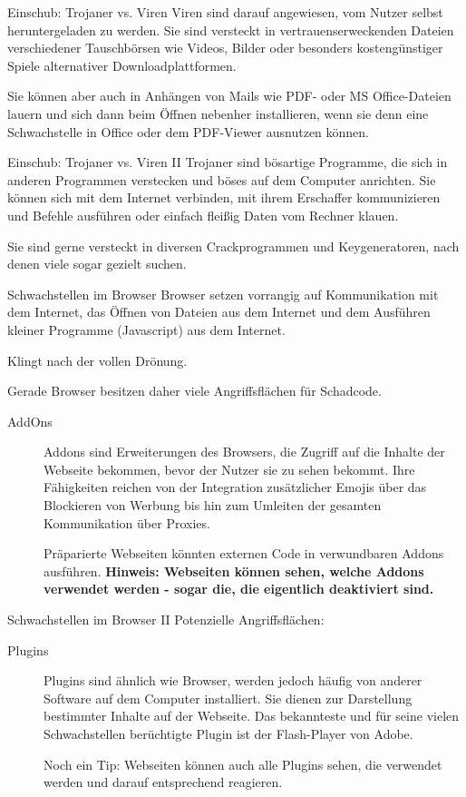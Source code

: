 \documentclass[utf8]{beamer}
\begin{document}
	\begin{frame}{Einschub: Trojaner vs. Viren}
		Viren sind darauf angewiesen, vom Nutzer selbst heruntergeladen zu werden. Sie sind versteckt in vertrauenserweckenden Dateien verschiedener Tauschbörsen wie Videos, Bilder oder besonders kostengünstiger Spiele alternativer Downloadplattformen.
		
		Sie können aber auch in Anhängen von Mails wie PDF- oder MS Office-Dateien lauern und sich dann beim Öffnen nebenher installieren, wenn sie denn eine Schwachstelle in Office oder dem PDF-Viewer ausnutzen können.
	\end{frame}

	\begin{frame}{Einschub: Trojaner vs. Viren II}
		Trojaner sind bösartige Programme, die sich in anderen Programmen verstecken und böses auf dem Computer anrichten. Sie können sich mit dem Internet verbinden, mit ihrem Erschaffer kommunizieren und Befehle ausführen oder einfach fleißig Daten vom Rechner klauen.
		
		Sie sind gerne versteckt in diversen Crackprogrammen und Keygeneratoren, nach denen viele sogar gezielt suchen.
	\end{frame}

	\begin{frame}{Schwachstellen im Browser}
		Browser setzen vorrangig auf Kommunikation mit dem Internet, das Öffnen von Dateien aus dem Internet und dem Ausführen kleiner Programme (Javascript) aus dem Internet.
		
		Klingt nach der vollen Drönung.
		
		Gerade Browser besitzen daher viele Angriffsflächen für Schadcode. 
		\begin{description}
			\item[AddOns] {Addons sind Erweiterungen des Browsers, die Zugriff auf die Inhalte der Webseite bekommen, bevor der Nutzer sie zu sehen bekommt. Ihre Fähigkeiten reichen von der Integration zusätzlicher Emojis über das Blockieren von Werbung bis hin zum Umleiten der gesamten Kommunikation über Proxies. 
			
			Präparierte Webseiten könnten externen Code in verwundbaren Addons ausführen. \textbf{Hinweis: Webseiten können sehen, welche Addons verwendet werden - sogar die, die eigentlich deaktiviert sind.}}
		\end{description}
	\end{frame}

\begin{frame}{Schwachstellen im Browser II}
	Potenzielle Angriffsflächen:
	\begin{description}
		\item[Plugins] {Plugins sind ähnlich wie Browser, werden jedoch häufig von anderer Software auf dem Computer installiert. Sie dienen zur Darstellung bestimmter Inhalte auf der Webseite. Das bekannteste und für seine vielen Schwachstellen berüchtigte Plugin ist der Flash-Player von Adobe.
		
		Noch ein Tip: Webseiten können auch alle Plugins sehen, die verwendet werden und darauf entsprechend reagieren.}
	\end{description}
\end{frame}
\end{document}
